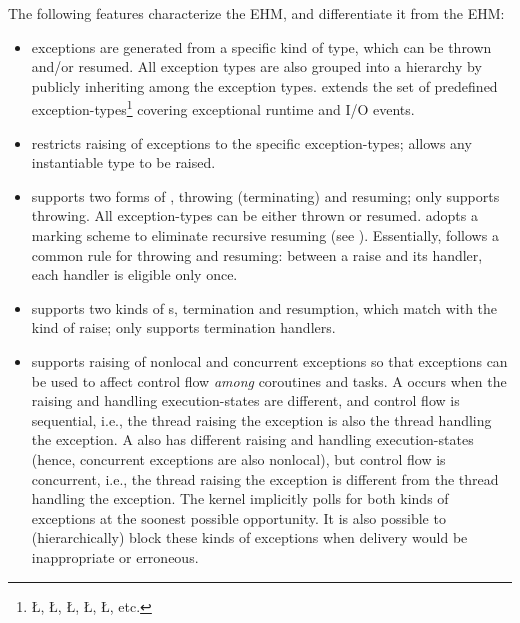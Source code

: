 \documentclass[openright,twoside]{report}
\begin{document}
The following features characterize the \uC EHM, and differentiate it from the \CC EHM:
\begin{itemize}
\item
\uC exceptions are generated from a specific kind of type, which can be thrown and/or resumed.
All exception types are also grouped into a hierarchy by publicly inheriting among the exception types.
\uC extends the \CC set of predefined exception-types\footnote{\LGinlinetrue\LGbegin\lgrinde\L{}\endlgrinde\LGend{}, \LGinlinetrue\LGbegin\lgrinde\L{}\endlgrinde\LGend{}, \LGinlinetrue\LGbegin\lgrinde\L{}\endlgrinde\LGend{}, \LGinlinetrue\LGbegin\lgrinde\L{}\endlgrinde\LGend{}, \LGinlinetrue\LGbegin\lgrinde\L{}\endlgrinde\LGend{}, etc.} covering \uC exceptional runtime and I/O events.
\item
\uC restricts raising of exceptions to the specific exception-types;
\CC allows any instantiable type to be raised.
\item
\uC supports two forms of , throwing (terminating) and resuming;
\CC only supports throwing.
All \uC exception-types can be either thrown or resumed.
\uC adopts a marking scheme to eliminate recursive resuming (see ).
Essentially, \uC follows a common rule for throwing and resuming: between a raise and its handler, each handler is eligible only once.
\item
\uC supports two kinds of s, termination and resumption, which match with the kind of raise;
\CC only supports termination handlers.
\item
\uC supports raising of nonlocal and concurrent exceptions so that exceptions can be used to affect control flow \emph{among} coroutines and tasks.
A  occurs when the raising and handling execution-states are different, and control flow is sequential, i.e., the thread raising the exception is also the thread handling the exception.
A  also has different raising and handling execution-states (hence, concurrent exceptions are also nonlocal), but control flow is concurrent, i.e., the thread raising the exception is different from the thread handling the exception.
The \uC kernel implicitly polls for both kinds of exceptions at the soonest possible opportunity.
It is also possible to (hierarchically) block these kinds of exceptions when delivery would be inappropriate or erroneous.
\end{itemize}
\end{document}
